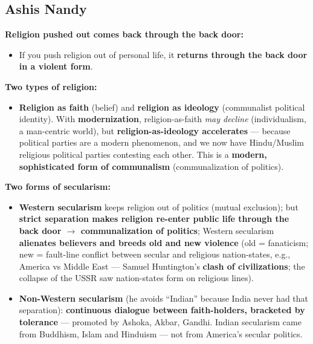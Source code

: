 \sectiondivider

\subsection{Ashis Nandy}

\begin{CriticalPoint}
\textbf{Religion pushed out comes back through the back door:}
\begin{itemize}
\item If you push religion out of personal life, it \textbf{returns through the back door in a violent form}.
\end{itemize}
\end{CriticalPoint}

\begin{KeyConcept}
\textbf{Two types of religion:}
\begin{itemize}
\item \textbf{Religion as faith} (belief) and \textbf{religion as ideology} (communalist political identity). With \textbf{modernization}, religion-as-faith \textit{may decline} (individualism, a man-centric world), but \textbf{religion-as-ideology accelerates} --- because political parties are a modern phenomenon, and we now have Hindu/Muslim religious political parties contesting each other. This is a \textbf{modern, sophisticated form of communalism} (communalization of politics).
\end{itemize}
\end{KeyConcept}

\begin{KeyConcept}
\textbf{Two forms of secularism:}
\begin{itemize}
\item \textbf{Western secularism} keeps religion out of politics (mutual exclusion); but \textbf{strict separation makes religion re-enter public life through the back door $\rightarrow$ communalization of politics}; Western secularism \textbf{alienates believers and breeds old and new violence} (old = fanaticism; new = fault-line conflict between secular and religious nation-states, e.g., America vs Middle East --- Samuel Huntington's \textbf{clash of civilizations}; the collapse of the USSR saw nation-states form on religious lines).
\item \textbf{Non-Western secularism} (he avoids ``Indian'' because India never had that separation): \textbf{continuous dialogue between faith-holders, bracketed by tolerance} --- promoted by Ashoka, Akbar, Gandhi. Indian secularism came from Buddhism, Islam and Hinduism --- not from America's secular politics.
\end{itemize}
\end{KeyConcept}

